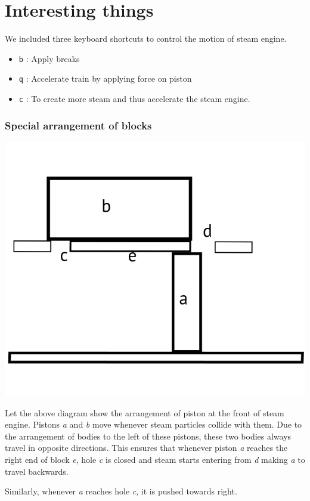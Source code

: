\documentclass[11pt]{article}
\begin{document}
\section*{Interesting things}
We included three keyboard shortcuts to control the motion of steam engine.
\begin{itemize}
\item {\tt b} : Apply breaks 
\item {\tt q} :
Accelerate train by applying force on piston 
\item {\tt c} :
To create more steam and thus accelerate the steam engine.
\end{itemize}
\subsubsection*{Special arrangement of blocks}
\centerline{\includegraphics[scale = 0.3]{drawing.png} }
Let the above diagram show the arrangement of piston at the front of steam engine. Pistons {\it a} and {\it b} move whenever steam particles collide with them. Due to the arrangement of bodies to the left of these pistons, these two bodies always travel in opposite directions. This ensures that whenever piston {\it a} reaches the right end of block {\it e}, hole {\it c} is closed and steam starts entering from {\it d} making {\it a} to travel backwards.

Similarly, whenever {\it a} reaches hole {\it c}, it is pushed towards right.  
\end{document}
